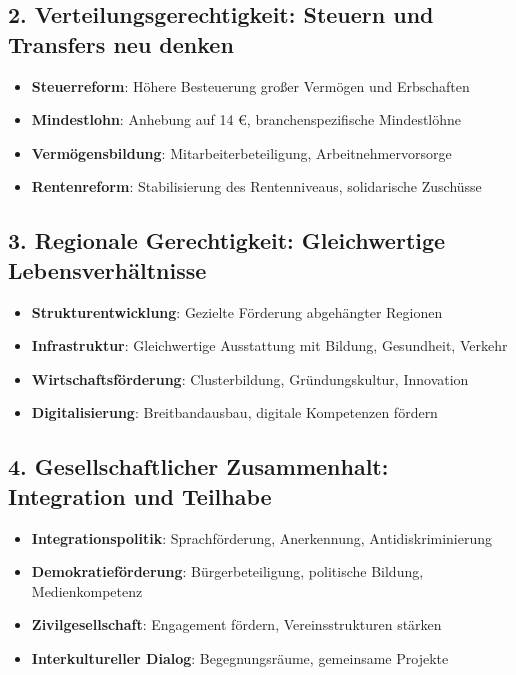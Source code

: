 \subsection{2. Verteilungsgerechtigkeit: Steuern und Transfers neu denken}

\begin{itemize}
    \item \textbf{Steuerreform}: Höhere Besteuerung großer Vermögen und Erbschaften
    \item \textbf{Mindestlohn}: Anhebung auf 14 €, branchenspezifische Mindestlöhne
    \item \textbf{Vermögensbildung}: Mitarbeiterbeteiligung, Arbeitnehmervorsorge
    \item \textbf{Rentenreform}: Stabilisierung des Rentenniveaus, solidarische Zuschüsse
\end{itemize}

\subsection{3. Regionale Gerechtigkeit: Gleichwertige Lebensverhältnisse}

\begin{itemize}
    \item \textbf{Strukturentwicklung}: Gezielte Förderung abgehängter Regionen
    \item \textbf{Infrastruktur}: Gleichwertige Ausstattung mit Bildung, Gesundheit, Verkehr
    \item \textbf{Wirtschaftsförderung}: Clusterbildung, Gründungskultur, Innovation
    \item \textbf{Digitalisierung}: Breitbandausbau, digitale Kompetenzen fördern
\end{itemize}

\subsection{4. Gesellschaftlicher Zusammenhalt: Integration und Teilhabe}

\begin{itemize}
    \item \textbf{Integrationspolitik}: Sprachförderung, Anerkennung, Antidiskriminierung
    \item \textbf{Demokratieförderung}: Bürgerbeteiligung, politische Bildung, Medienkompetenz
    \item \textbf{Zivilgesellschaft}: Engagement fördern, Vereinsstrukturen stärken
    \item \textbf{Interkultureller Dialog}: Begegnungsräume, gemeinsame Projekte
\end{itemize}

